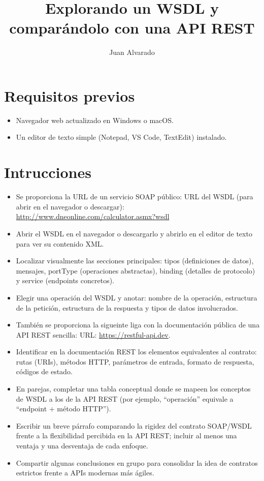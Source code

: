 \documentclass[11pt,a4paper]{article}
\title{Explorando un WSDL y comparándolo con una API REST}
\author{Juan Alvarado}
\date{}
\begin{document}
	
	\maketitle
	
	\section{Requisitos previos}
	\begin{itemize}
		\item Navegador web actualizado en Windows o macOS.
		\item 	Un editor de texto simple (Notepad, VS Code, TextEdit) instalado.
	\end{itemize}
	
	\section*{Intrucciones}
	
	\begin{itemize}
		\item Se proporciona la URL de un servicio SOAP público: URL del WSDL (para abrir en el navegador o descargar):
		\href{http://www.dneonline.com/calculator.asmx?wsdl}{http://www.dneonline.com/calculator.asmx?wsdl}
		\item 	Abrir el WSDL en el navegador o descargarlo y abrirlo en el editor de texto para ver su contenido XML.
		\item 	Localizar visualmente las secciones principales: tipos (definiciones de datos), mensajes, portType (operaciones abstractas), binding (detalles de protocolo) y service (endpoints concretos).
		\item 	Elegir una operación del WSDL y anotar: nombre de la operación, estructura de la petición, estructura de la respuesta y tipos de datos involucrados.
		\item 	También se proporciona la sigueinte liga con la documentación pública de una API REST sencilla: URL: \href{https://restful-api.dev}{https://restful-api.dev}.
		\item 	Identificar en la documentación REST los elementos equivalentes al contrato: rutas (URIs), métodos HTTP, parámetros de entrada, formato de respuesta, códigos de estado.
		\item En parejas, completar una tabla conceptual donde se mapeen los conceptos de WSDL a los de la API REST (por ejemplo, “operación” equivale a “endpoint + método HTTP”).
		\item 	Escribir un breve párrafo comparando la rigidez del contrato SOAP/WSDL frente a la flexibilidad percibida en la API REST; incluir al menos una ventaja y una desventaja de cada enfoque.
		\item Compartir algunas conclusiones en grupo para consolidar la idea de contratos estrictos frente a APIs modernas más ágiles.
	\end{itemize}
	
	
\end{document}
